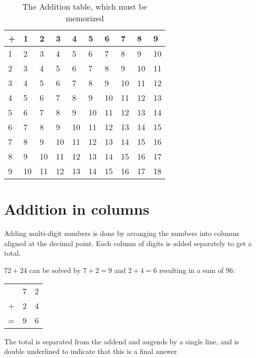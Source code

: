\documentclass{article}
\begin{document}
\begin{table}[h]
\centering
\begin{tabular}{|l|l|l|l|l|l|l|l|l|l|}
\hline
+ & 1  & 2  & 3  & 4  & 5  & 6  & 7  & 8  & 9                       \\ \hline
1 & 2  & 3  & 4  & 5  & 6  & 7  & 8  & 9  & 10                      \\ \hline
2 & 3  & 4  & 5  & 6  & 7  & 8  & 9  & 10 & 11                      \\ \hline
3 & 4  & 5  & 6  & 7  & 8  & 9  & 10 & 11 & 12                      \\ \hline
4 & 5  & 6  & 7  & 8  & 9  & 10 & 11 & 12 & 13                      \\ \hline
5 & 6  & 7  & 8  & 9  & 10 & 11 & 12 & 13 & 14                      \\ \hline
6 & 7  & 8  & 9  & 10 & 11 & 12 & 13 & 14 & 15                      \\ \hline
7 & 8  & 9  & 10 & 11 & 12 & 13 & 14 & 15 & 16                      \\ \hline
8 & 9  & 10 & 11 & 12 & 13 & 14 & 15 & 16 & 17                      \\ \hline
9 & 10 & 11 & 12 & 13 & 14 & 15 & 16 & 17 & \multicolumn{1}{c|}{18} \\ \hline
\end{tabular}
\caption*{The Addition table, which must be memorized}
\end{table}

\newpage

\section{Addition in columns}
Adding multi-digit numbers is done by arranging the numbers into columns aligned at the decimal point. Each column of digits is added separately to get a total.

$72 + 24$ can be solved by $7 + 2 = 9$ and $2 + 4 = 6$ resulting in a sum of 96:

\begin{center}
\begin{tabular}{c@{\,}c@{\,}c@{\,}}
 &7&2\\
+&2&4\\
\hline
=&9&6\\
\hline
\hline
\end{tabular}
\end{center}

The total is separated from the addend and augends by a single line, and is double underlined to indicate that this is a final answer.
\end{document}
